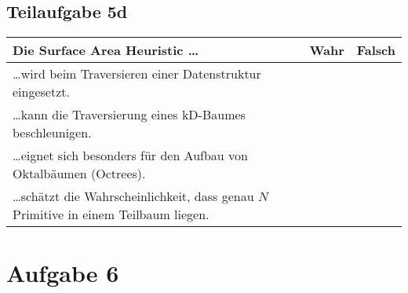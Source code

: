 \documentclass[a4paper]{scrartcl}
\begin{document}
\subsection*{Teilaufgabe 5d}
\begin{tabular}{p{12cm}ll}\toprule
	\textbf{Die Surface Area Heuristic \dots}                                                & \textbf{Wahr} & \textbf{Falsch} \\\midrule
	\dots wird beim Traversieren einer Datenstruktur eingesetzt.                             & \Square       & \CheckedBox \\
	\dots kann die Traversierung eines kD-Baumes beschleunigen.                              & \CheckedBox   & \Square     \\
	\dots eignet sich besonders für den Aufbau von Oktalbäumen (Octrees).                    & \Square       & \CheckedBox \\
	\dots schätzt die Wahrscheinlichkeit, dass genau $N$ Primitive in einem Teilbaum liegen. & \Square       & \CheckedBox \\\bottomrule
\end{tabular}

\section*{Aufgabe 6}
\end{document}
